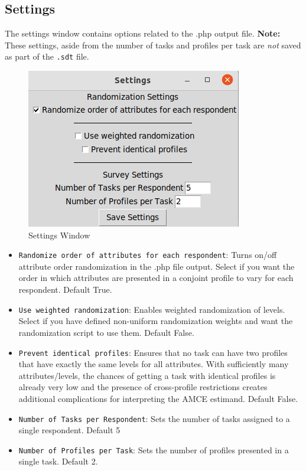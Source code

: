 \documentclass[12pt]{article}
\begin{document}
\subsection{Settings}

The settings window contains options related to the .php output file. \textbf{Note:} These settings, aside from the number of tasks and profiles per task are \textit{not} saved as part of the \texttt{.sdt} file.

\begin{figure}[ht!]
\centering\includegraphics[scale=.6]{graphics/settings_screen.png}
\caption{Settings Window}
\end{figure}

\begin{itemize}
\item \texttt{Randomize order of attributes for each respondent}: Turns on/off attribute order randomization in the .php file output. Select if you want the order in which attributes are presented in a conjoint profile to vary for each respondent. Default True.
\item \texttt{Use weighted randomization}: Enables weighted randomization of levels. Select if you have defined non-uniform randomization weights and want the randomization script to use them. Default False.
\item \texttt{Prevent identical profiles}: Ensures that no task can have two profiles that have exactly the same levels for all attributes. With sufficiently many attributes/levels, the chances of getting a task with identical profiles is already very low and the presence of cross-profile restrictions creates additional complications for interpreting the AMCE estimand. Default False.
\item \texttt{Number of Tasks per Respondent}: Sets the number of tasks assigned to a single respondent. Default 5
\item \texttt{Number of Profiles per Task}: Sets the number of profiles presented in a single task. Default 2.
\end{itemize}
\end{document}
